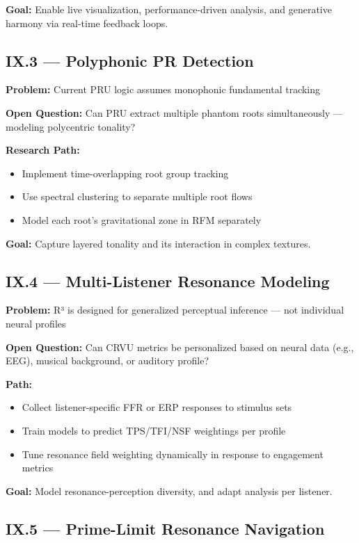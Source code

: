\textbf{Goal:}  
Enable live visualization, performance-driven analysis, and generative harmony via real-time feedback loops.

\subsection*{IX.3 — Polyphonic PR Detection}

\textbf{Problem:}  
Current PRU logic assumes monophonic fundamental tracking

\textbf{Open Question:}  
Can PRU extract multiple phantom roots simultaneously — modeling polycentric tonality?

\textbf{Research Path:}
\begin{itemize}
    \item Implement time-overlapping root group tracking
    \item Use spectral clustering to separate multiple root flows
    \item Model each root’s gravitational zone in RFM separately
\end{itemize}

\textbf{Goal:}  
Capture layered tonality and its interaction in complex textures.

\subsection*{IX.4 — Multi-Listener Resonance Modeling}

\textbf{Problem:}  
R³ is designed for generalized perceptual inference — not individual neural profiles

\textbf{Open Question:}  
Can CRVU metrics be personalized based on neural data (e.g., EEG), musical background, or auditory profile?

\textbf{Path:}
\begin{itemize}
    \item Collect listener-specific FFR or ERP responses to stimulus sets
    \item Train models to predict TPS/TFI/NSF weightings per profile
    \item Tune resonance field weighting dynamically in response to engagement metrics
\end{itemize}

\textbf{Goal:}  
Model resonance-perception diversity, and adapt analysis per listener.

\subsection*{IX.5 — Prime-Limit Resonance Navigation}

